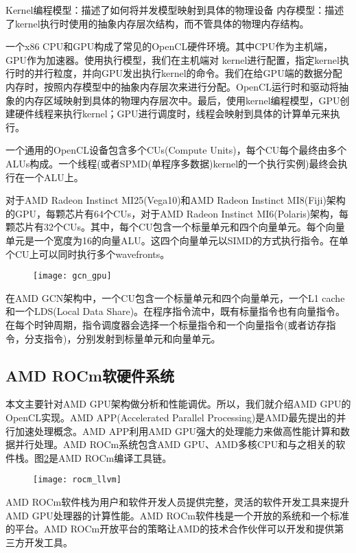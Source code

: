 Kernel编程模型：描述了如何将并发模型映射到具体的物理设备
内存模型：描述了kernel执行时使用的抽象内存层次结构，而不管具体的物理内存结构。

一个x86 CPU和GPU构成了常见的OpenCL硬件环境。其中CPU作为主机端，GPU作为加速器。使用执行模型，我们在主机端对 kernel进行配置，指定kernel执行时的并行粒度，并向GPU发出执行kernel的命令。我们在给GPU端的数据分配内存时，按照内存模型中的抽象内存层次来进行分配。OpenCL运行时和驱动将抽象的内存区域映射到具体的物理内存层次中。最后，使用kernel编程模型，GPU创建硬件线程来执行kernel；GPU进行调度时，线程会映射到具体的计算单元来执行。

一个通用的OpenCL设备包含多个CUs(Compute Units)，每个CU每个最终由多个ALUs构成。一个线程(或者SPMD(单程序多数据)kernel的一个执行实例)最终会执行在一个ALU上。

对于AMD Radeon Instinct MI25(Vega10)和AMD Radeon Instinct MI8(Fiji)架构的GPU，每颗芯片有64个CUs，对于AMD Radeon Instinct MI6(Polaris)架构，每颗芯片有32个CUs。其中，每个CU包含一个标量单元和四个向量单元。每个向量单元是一个宽度为16的向量ALU。这四个向量单元以SIMD的方式执行指令。在单个CU上可以同时执行多个wavefronts。
\begin{figure}[htbp]
	\centering
	\texttt{[image: gcn\_gpu]}
	\label{fig:gcn_gpu}
\end{figure}
在AMD GCN架构中，一个CU包含一个标量单元和四个向量单元，一个L1 cache和一个LDS(Local Data Share)。在程序指令流中，既有标量指令也有向量指令。在每个时钟周期，指令调度器会选择一个标量指令和一个向量指令(或者访存指令，分支指令)，分别发射到标量单元和向量单元。


\subsection{AMD ROCm软硬件系统}
本文主要针对AMD GPU架构做分析和性能调优。所以，我们就介绍AMD GPU的OpenCL实现。AMD APP(Accelerated Parallel Processing)是AMD最先提出的并行加速处理概念。AMD APP利用AMD GPU强大的处理能力来做高性能计算和数据并行处理。AMD ROCm系统包含AMD GPU、AMD多核CPU和与之相关的软件栈。图\ref{fig:rocm_llvm}是AMD ROCm编译工具链。
\begin{figure}[htbp]
	\centering
	\texttt{[image: rocm\_llvm]}
	\label{fig:rocm_llvm}
\end{figure}

AMD ROCm软件栈为用户和软件开发人员提供完整，灵活的软件开发工具来提升AMD GPU处理器的计算性能。AMD ROCm软件栈是一个开放的系统和一个标准的平台。AMD ROCm开放平台的策略让AMD的技术合作伙伴可以开发和提供第三方开发工具。

